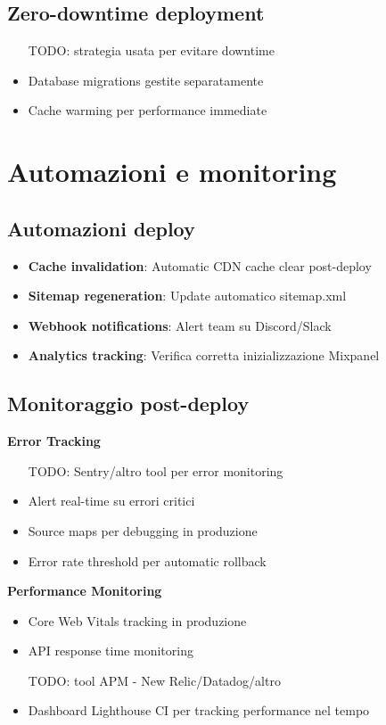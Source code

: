 \subsection{Zero-downtime deployment}
\begin{itemize}
  \item [TODO: strategia usata per evitare downtime]
  \item Database migrations gestite separatamente
  \item Cache warming per performance immediate
\end{itemize}

\section{Automazioni e monitoring}

\subsection{Automazioni deploy}
\begin{itemize}
  \item \textbf{Cache invalidation}: Automatic CDN cache clear post-deploy
  \item \textbf{Sitemap regeneration}: Update automatico sitemap.xml
  \item \textbf{Webhook notifications}: Alert team su Discord/Slack
  \item \textbf{Analytics tracking}: Verifica corretta inizializzazione Mixpanel
\end{itemize}

\subsection{Monitoraggio post-deploy}
\textbf{Error Tracking}
\begin{itemize}
  \item [TODO: Sentry/altro tool per error monitoring]
  \item Alert real-time su errori critici
  \item Source maps per debugging in produzione
  \item Error rate threshold per automatic rollback
\end{itemize}

\textbf{Performance Monitoring}
\begin{itemize}
  \item Core Web Vitals tracking in produzione
  \item API response time monitoring
  \item [TODO: tool APM - New Relic/Datadog/altro]
  \item Dashboard Lighthouse CI per tracking performance nel tempo
\end{itemize}

